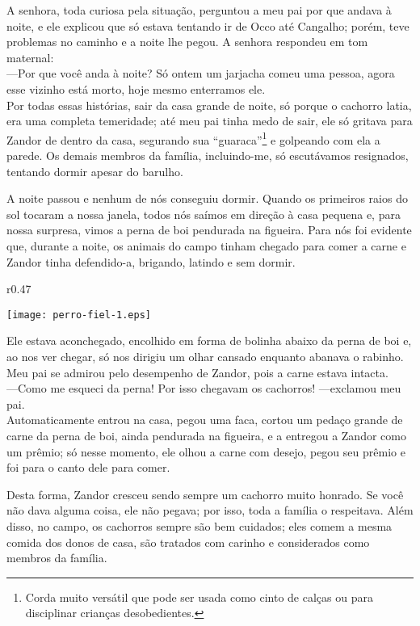 A senhora, toda curiosa pela situação, perguntou a meu pai por que andava à noite, e ele explicou que só estava tentando ir de Occo até Cangalho; porém, teve problemas no caminho e a noite lhe pegou. 
A senhora respondeu em tom maternal:\\\indent 
---Por que você anda à noite? Só ontem um jarjacha comeu uma pessoa, agora esse vizinho está morto, hoje mesmo enterramos ele.\\\indent
Por todas essas histórias, sair da casa grande de noite, só porque o cachorro latia, era uma completa temeridade; até meu pai tinha medo de sair, ele só gritava para Zandor de dentro da casa, segurando sua ``guaraca''\footnote{Corda muito versátil que pode ser usada como cinto de calças ou para disciplinar crianças desobedientes.} e golpeando com ela a parede. 
Os demais membros da família, incluindo-me, só escutávamos resignados, tentando dormir apesar do barulho.

A noite passou e nenhum de nós conseguiu dormir. 
Quando os primeiros raios do sol tocaram a nossa janela, todos nós saímos em direção à casa pequena e, para nossa surpresa, vimos a perna de boi pendurada na figueira. 
Para nós foi evidente que, durante a noite, os animais do campo tinham chegado para comer a carne e Zandor tinha defendido-a, brigando, latindo e sem dormir.
\ifdefined\EnableIncludeImages 
\begin{wrapfigure}{r}{0.47\textwidth}
  \begin{center}
  \vspace{-0.5cm}
    \texttt{[image: perro-fiel-1.eps]}
  \end{center}
  \vspace{-0.5cm}
\end{wrapfigure}
\fi
Ele estava aconchegado, encolhido em forma de bolinha abaixo da perna de boi e, ao nos ver chegar, só nos dirigiu um olhar cansado enquanto abanava o rabinho. Meu pai se admirou pelo desempenho de Zandor, pois a carne estava intacta.\\\indent
---Como me esqueci da perna! Por isso chegavam os cachorros! ---exclamou meu pai.\\\indent
Automaticamente entrou na casa, pegou uma faca, cortou um pedaço grande de carne da perna de boi, ainda pendurada na figueira, e a entregou a Zandor como um prêmio; só nesse momento, ele olhou a carne com desejo, pegou seu prêmio e foi para o canto dele para comer.

Desta forma, Zandor cresceu sendo sempre um cachorro muito honrado. Se você não dava alguma coisa, ele não pegava; por isso, toda a família o respeitava. Além disso, no campo, os cachorros sempre são bem cuidados; eles comem a mesma comida dos donos de casa, são tratados com carinho e considerados como membros da família.


